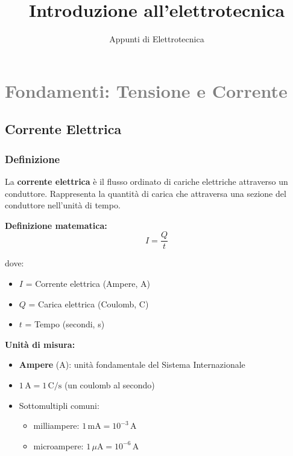 \documentclass[a4paper,12pt]{article}
\title{Introduzione all'elettrotecnica}
\author{Appunti di Elettrotecnica}
\date{}
\begin{document}
\maketitle
\tableofcontents

\section{\textcolor{gray}{Fondamenti: Tensione e Corrente}}

\subsection{Corrente Elettrica}

\subsubsection{Definizione}

La \textbf{corrente elettrica} è il flusso ordinato di cariche elettriche attraverso un conduttore. Rappresenta la quantità di carica che attraversa una sezione del conduttore nell'unità di tempo.

\textbf{Definizione matematica:}
\begin{equation}
I = \frac{Q}{t}
\end{equation}

dove:
\begin{itemize}
    \item $I$ = Corrente elettrica (Ampere, A)
    \item $Q$ = Carica elettrica (Coulomb, C)
    \item $t$ = Tempo (secondi, s)
\end{itemize}

\textbf{Unità di misura:}
\begin{itemize}
    \item \textbf{Ampere} (A): unità fondamentale del Sistema Internazionale
    \item $1\,\mathrm{A} = 1\,\mathrm{C/s}$ (un coulomb al secondo)
    \item Sottomultipli comuni:
    \begin{itemize}
        \item milliampere: $1\,\mathrm{mA} = 10^{-3}\,\mathrm{A}$
        \item microampere: $1\,\mu\mathrm{A} = 10^{-6}\,\mathrm{A}$
    \end{itemize}
\end{itemize}
\end{document}

